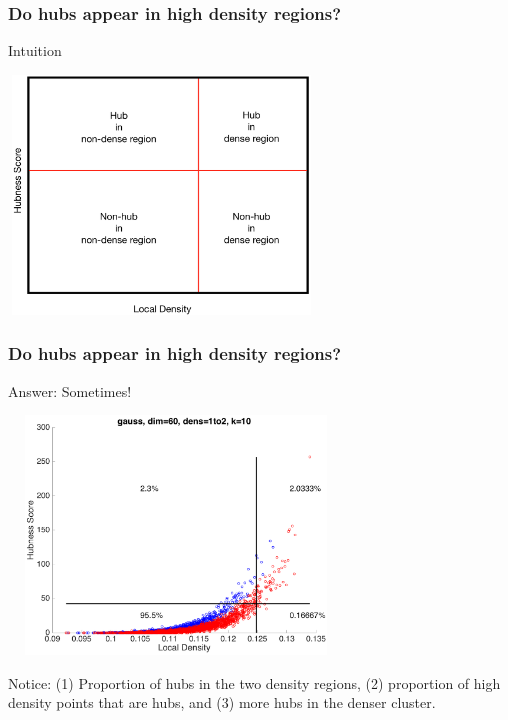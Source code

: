 \documentclass{beamer}
\begin{document}
\begin{frame}
\frametitle{Do hubs appear in high density regions?}

Intuition

\smallskip

\centering
\includegraphics[width=3.2in,height=2.5in]{./fig/DensHub-Intuition.png}

\end{frame}

\begin{frame}
\frametitle{Do hubs appear in high density regions?}

{\small Answer: Sometimes!}

\smallskip

\centering
\includegraphics[width=3.5in,height=2.5in]{./fig/gauss-dim60-1000to2000-k10-DensHub.png}

\smallskip

{\small Notice: (1) Proportion of hubs in the two density regions, (2) proportion of high density points that are hubs, and (3) more hubs in the denser cluster.}

\end{frame}
\end{document}

